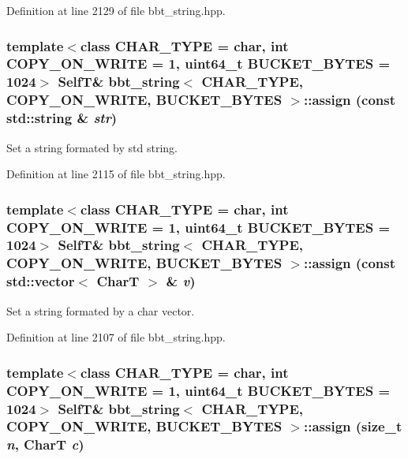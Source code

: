 Definition at line 2129 of file bbt\_\-string.hpp.\hypertarget{classbbt__string_1d91c8aa0f24df605052b7bd2490bed4}{
\subsubsection[{assign}]{\setlength{\rightskip}{0pt plus 5cm}template$<$class CHAR\_\-TYPE  = char, int COPY\_\-ON\_\-WRITE = 1, uint64\_\-t BUCKET\_\-BYTES = 1024$>$ {\bf SelfT}\& {\bf bbt\_\-string}$<$ CHAR\_\-TYPE, COPY\_\-ON\_\-WRITE, BUCKET\_\-BYTES $>$::assign (const std::string \& {\em str})}}
\label{classbbt__string_1d91c8aa0f24df605052b7bd2490bed4}


Set a string formated by std string. 

Definition at line 2115 of file bbt\_\-string.hpp.\hypertarget{classbbt__string_4e5b4bef27753e3dacc0523ec42f4d7e}{
\subsubsection[{assign}]{\setlength{\rightskip}{0pt plus 5cm}template$<$class CHAR\_\-TYPE  = char, int COPY\_\-ON\_\-WRITE = 1, uint64\_\-t BUCKET\_\-BYTES = 1024$>$ {\bf SelfT}\& {\bf bbt\_\-string}$<$ CHAR\_\-TYPE, COPY\_\-ON\_\-WRITE, BUCKET\_\-BYTES $>$::assign (const std::vector$<$ CharT $>$ \& {\em v})}}
\label{classbbt__string_4e5b4bef27753e3dacc0523ec42f4d7e}


Set a string formated by a char vector. 

Definition at line 2107 of file bbt\_\-string.hpp.\hypertarget{classbbt__string_34dde768fe5e866486424320e052228f}{
\subsubsection[{assign}]{\setlength{\rightskip}{0pt plus 5cm}template$<$class CHAR\_\-TYPE  = char, int COPY\_\-ON\_\-WRITE = 1, uint64\_\-t BUCKET\_\-BYTES = 1024$>$ {\bf SelfT}\& {\bf bbt\_\-string}$<$ CHAR\_\-TYPE, COPY\_\-ON\_\-WRITE, BUCKET\_\-BYTES $>$::assign (size\_\-t {\em n}, \/  CharT {\em c})}}
\label{classbbt__string_34dde768fe5e866486424320e052228f}


